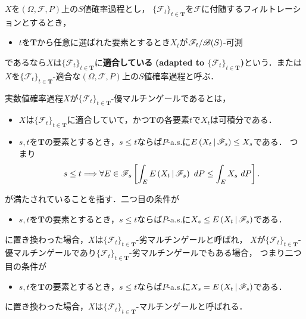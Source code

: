	
	\begin{screen}
		\begin{dfn}[適合]
			$X$を$(\Omega,\mathscr{F},P)$上の$S$値確率過程とし，
			$\{\mathscr{F}_t\}_{t \in \mathbf{T}}$を$\mathscr{F}$に付随するフィルトレーションとするとき，
			\begin{itemize}
				\item $t$を$\mathbf{T}$から任意に選ばれた要素とするとき$X_t$が$\mathscr{F}_t/\mathscr{B}(S)$-可測
			\end{itemize}
			であるなら$X$は$\{\mathscr{F}_t\}_{t \in \mathbf{T}}$に{\bf 適合している}
			{\bf (adapted to $\{\mathscr{F}_t\}_{t \in \mathbf{T}}$)}という．または
			$X$を$\{\mathscr{F}_t\}_{t \in \mathbf{T}}$-適合な$(\Omega,\mathscr{F},P)$上の$S$値確率過程と呼ぶ．
		\end{dfn}
	\end{screen}
	
	実数値確率過程$X$が$\{\mathscr{F}_t\}_{t \in \mathbf{T}}$-優マルチンゲールであるとは，
	\begin{itemize}
		\item $X$は$\{\mathscr{F}_t\}_{t \in \mathbf{T}}$に適合していて，かつ$\mathbf{T}$の各要素$t$で$X_t$は可積分である．
		\item $s,t$を$\mathbf{T}$の要素とするとき，$s \leq t$ならば$P$-a.s.に$E\left( X_t \, \middle|\, \mathscr{F}_s \right) \leq X_s$である．
			つまり
			\begin{align}
				s \leq t \Longrightarrow 
				\forall E \in \mathscr{F}_s \left[ \int_E E\left( X_t \, \middle|\, \mathscr{F}_s \right)\ dP \leq \int_E X_s\ dP\right].
			\end{align}
	\end{itemize}
	が満たされていることを指す．二つ目の条件が
	\begin{itemize}
		\item $s,t$を$\mathbf{T}$の要素とするとき，$s \leq t$ならば$P$-a.s.に$X_s \leq E\left( X_t \, \middle|\, \mathscr{F}_s \right)$である．
	\end{itemize}
	に置き換わった場合，$X$は$\{\mathscr{F}_t\}_{t \in \mathbf{T}}$-劣マルチンゲールと呼ばれ，
	$X$が$\{\mathscr{F}_t\}_{t \in \mathbf{T}}$-優マルチンゲールであり$\{\mathscr{F}_t\}_{t \in \mathbf{T}}$-劣マルチンゲールでもある場合，
	つまり二つ目の条件が
	\begin{itemize}
		\item $s,t$を$\mathbf{T}$の要素とするとき，$s \leq t$ならば$P$-a.s.に$X_s = E\left( X_t \, \middle|\, \mathscr{F}_s \right)$である．
	\end{itemize}
	に置き換わった場合，$X$は$\{\mathscr{F}_t\}_{t \in \mathbf{T}}$-マルチンゲールと呼ばれる．
	
